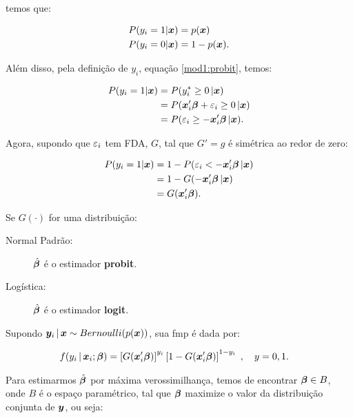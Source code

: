 \documentclass[11pt, oneside, a4paper, article]{article}
\numberwithin{equation}{section}
\begin{document}
\begin{description}
\noindent
temos que:

\vspace{-1 em}
\begin{align*}
P( y_{i} = 1 | \boldsymbol{x} ) &= p( \boldsymbol{x} )
\\
P( y_{i} = 0 | \boldsymbol{x} ) &= 1 - p( \boldsymbol{x} ).
\end{align*}

Além disso, pela definição de $y_{i}$, equação \eqref{mod1:probit}, temos:

\vspace{-1 em}
\begin{align*}
P( y_{i} = 1 | \boldsymbol{x} ) &= P(y_{i}^{*} \geq 0 \, | \boldsymbol{x} )
\\
&= P( \boldsymbol{x}_{i}' \boldsymbol{\beta} + \varepsilon_{i} \geq 0 \, | \boldsymbol{x} )
\\
&= P( \varepsilon_{i} \geq - \boldsymbol{x}_{i}' \boldsymbol{\beta}  \, | \boldsymbol{x} ).
\end{align*}

\noindent
Agora, supondo que $\varepsilon_{i}$ tem FDA, $G$, tal que $G'=g$ é simétrica ao redor de zero:

\vspace{-1 em}
\begin{align*}
P( y_{i} = 1 | \boldsymbol{x} ) 
&= 1 - P( \varepsilon_{i} < - \boldsymbol{x}_{i}' \boldsymbol{\beta}  \, | \boldsymbol{x} )
\\
&= 1 - G( - \boldsymbol{x}_{i}' \boldsymbol{\beta}  \, | \boldsymbol{x} )
\\
&= G( \boldsymbol{x}_{i}' \boldsymbol{\beta} ).
\end{align*}

Se $G(\cdot)$ for uma distribuição:

\begin{description}
\item [Normal Padrão:] $\hat{\boldsymbol{\beta}}$ é o estimador \textbf{probit}.
\item [Logística:] $\hat{\boldsymbol{\beta}}$ é o estimador \textbf{logit}.
\end{description}

Supondo $\boldsymbol{y}_{i} \, | \, \boldsymbol{x} \sim Bernoulli(p(\boldsymbol{x}))$, sua fmp é dada por:

\vspace{-1 em}
\begin{align*}
f( y_{i} \, | \, \boldsymbol{x}_{i} ; \boldsymbol{\beta} ) 
&= 
\left[ G(\boldsymbol{x}_{i}' \boldsymbol{\beta} )  \right]^{y_{i}}
\left[ 1 - G(\boldsymbol{x}_{i}' \boldsymbol{\beta} )  \right]^{1 - y_{i}}
\; , \quad y=0,1.
\end{align*}

Para estimarmos $\hat{\boldsymbol{\beta}}$ por máxima verossimilhança, temos de encontrar $\boldsymbol{\beta} \in B$, onde $B$ é o espaço paramétrico, tal que $\boldsymbol{\beta}$ maximize o valor da distribuição conjunta de $\boldsymbol{y}$, ou seja:


\end{description}
\end{document}
